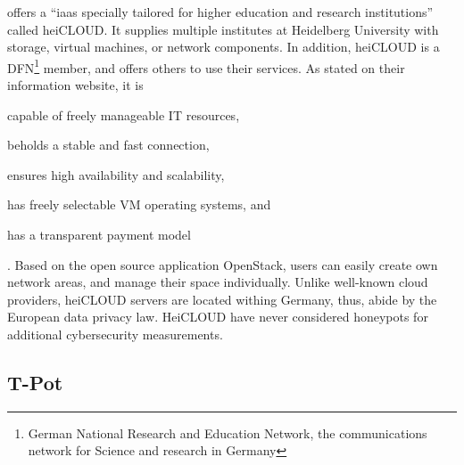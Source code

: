\citet{urz2021} offers a \enquote{\ac{iaas} specially tailored for higher education and research institutions} called heiCLOUD.
It supplies multiple institutes at Heidelberg University with storage, virtual machines, or network components.
In addition, heiCLOUD is a DFN\footnote{German National Research and Education Network, the communications network for Science and research in Germany} member, and offers others to use their services.
As stated on their information website\cite{heicloud2021}, it is
\begin{enumerate*}[label=(\roman*)]
    \item capable of freely manageable IT resources,
    \item beholds a stable and fast connection,
    \item ensures high availability and scalability,
    \item has freely selectable VM operating systems, and
    \item has a transparent payment model
\end{enumerate*} \cite{heicloud2021}.
Based on the open source application OpenStack, users can easily create own network areas, and manage their space individually.
Unlike well-known cloud providers, heiCLOUD servers are located withing Germany, thus, abide by the European data privacy law.
HeiCLOUD have never considered honeypots for additional cybersecurity measurements.

\subsection{T-Pot}
\label{subsec:tpot}

